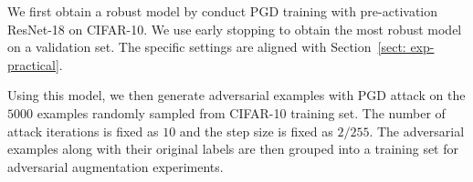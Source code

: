 
We first obtain a robust model by conduct PGD training with pre-activation ResNet-18 on CIFAR-10. We use early stopping to obtain the most robust model on a validation set. The specific settings are aligned with Section~\ref{sect: exp-practical}.

Using this model, we then generate adversarial examples with PGD attack on the $5000$ examples randomly sampled from CIFAR-10 training set. The number of attack iterations is fixed as $10$ and the step size is fixed as $2/255$. The adversarial examples along with their original labels are then grouped into a training set for adversarial augmentation experiments.


